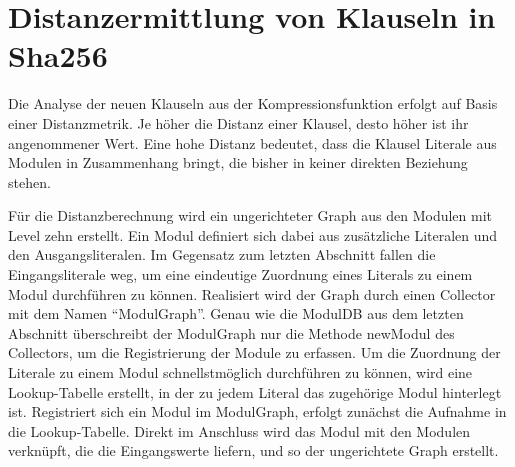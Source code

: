 \section{Distanzermittlung von Klauseln in Sha256}
\label{sec:ana:distance}

Die Analyse der neuen Klauseln aus der Kompressionsfunktion erfolgt auf Basis einer Distanzmetrik. Je höher die Distanz einer Klausel, desto höher
ist ihr angenommener Wert. Eine hohe Distanz bedeutet, dass die Klausel Literale aus Modulen in Zusammenhang bringt, die bisher in keiner direkten
Beziehung stehen.

Für die Distanzberechnung wird ein ungerichteter Graph aus den Modulen mit Level zehn erstellt. Ein Modul definiert sich dabei aus zusätzliche Literalen
und den Ausgangsliteralen. Im Gegensatz zum letzten Abschnitt fallen die Eingangsliterale weg, um eine eindeutige Zuordnung eines Literals zu einem
Modul durchführen zu können. Realisiert wird der Graph durch einen Collector mit dem Namen "`ModulGraph"'. Genau wie die ModulDB aus dem letzten Abschnitt
überschreibt der ModulGraph nur die Methode newModul des Collectors, um die Registrierung der Module zu erfassen. Um die Zuordnung der Literale zu einem
Modul schnellstmöglich durchführen zu können, wird eine Lookup-Tabelle erstellt, in der zu jedem Literal das zugehörige Modul hinterlegt ist. Registriert
sich ein Modul im ModulGraph, erfolgt zunächst die Aufnahme in die Lookup-Tabelle. Direkt im Anschluss wird das Modul mit den Modulen verknüpft, die die
Eingangswerte liefern, und so der ungerichtete Graph erstellt.

